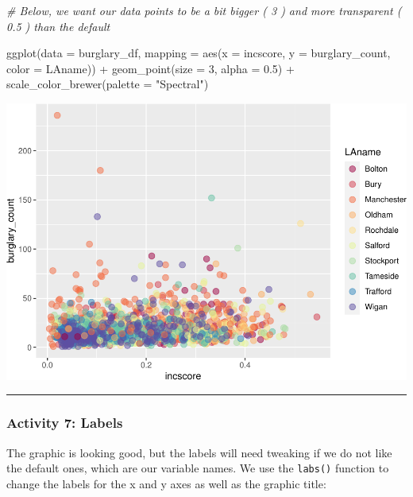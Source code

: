 \documentclass[
]{book}
\newenvironment{Shaded}{\begin{snugshade}}{\end{snugshade}}
\newcommand{\AttributeTok}[1]{\textcolor[rgb]{0.77,0.63,0.00}{#1}}
\newcommand{\CommentTok}[1]{\textcolor[rgb]{0.56,0.35,0.01}{\textit{#1}}}
\newcommand{\DecValTok}[1]{\textcolor[rgb]{0.00,0.00,0.81}{#1}}
\newcommand{\FloatTok}[1]{\textcolor[rgb]{0.00,0.00,0.81}{#1}}
\newcommand{\FunctionTok}[1]{\textcolor[rgb]{0.00,0.00,0.00}{#1}}
\newcommand{\NormalTok}[1]{#1}
\newcommand{\SpecialCharTok}[1]{\textcolor[rgb]{0.00,0.00,0.00}{#1}}
\newcommand{\StringTok}[1]{\textcolor[rgb]{0.31,0.60,0.02}{#1}}
\begin{document}
\begin{Shaded}
\begin{Highlighting}[]
\CommentTok{\# Below, we want our data points to be a bit bigger ( 3 ) and more transparent ( 0.5 ) than the default}

\FunctionTok{ggplot}\NormalTok{(}\AttributeTok{data =}\NormalTok{ burglary\_df, }\AttributeTok{mapping =} \FunctionTok{aes}\NormalTok{(}\AttributeTok{x =}\NormalTok{ incscore, }\AttributeTok{y =}\NormalTok{ burglary\_count, }\AttributeTok{color =}\NormalTok{ LAname)) }\SpecialCharTok{+} 
  \FunctionTok{geom\_point}\NormalTok{(}\AttributeTok{size =} \DecValTok{3}\NormalTok{, }\AttributeTok{alpha =} \FloatTok{0.5}\NormalTok{) }\SpecialCharTok{+} 
  \FunctionTok{scale\_color\_brewer}\NormalTok{(}\AttributeTok{palette =} \StringTok{"Spectral"}\NormalTok{)}
\end{Highlighting}
\end{Shaded}

\includegraphics{03-data-visualisation_files/figure-latex/unnamed-chunk-10-1.pdf}

\begin{center}\rule{0.5\linewidth}{0.5pt}\end{center}

\hypertarget{activity-7-labels}{%
\subsubsection{Activity 7: Labels}\label{activity-7-labels}}

The graphic is looking good, but the labels will need tweaking if we do not like the default ones, which are our variable names. We use the \texttt{labs()} function to change the labels for the x and y axes as well as the graphic title:
\end{document}

